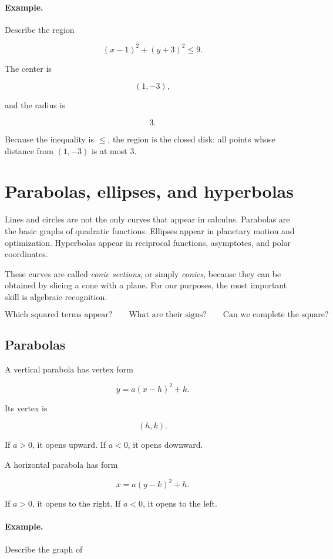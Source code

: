 \paragraph{Example.}
Describe the region

\[
(x-1)^2+(y+3)^2\le 9.
\]

The center is

\[
(1,-3),
\]

and the radius is

\[
3.
\]

Because the inequality is \(\le\), the region is the closed disk: all points whose
distance from \((1,-3)\) is at most \(3\).

\section{Parabolas, ellipses, and hyperbolas}
\label{appsec:conics}

Lines and circles are not the only curves that appear in calculus.  Parabolas are
the basic graphs of quadratic functions.  Ellipses appear in planetary motion and
optimization.  Hyperbolas appear in reciprocal functions, asymptotes, and polar
coordinates.

These curves are called \emph{conic sections}, or simply \emph{conics}, because
they can be obtained by slicing a cone with a plane.  For our purposes, the most
important skill is algebraic recognition.

\[
\text{Which squared terms appear?}
\qquad
\text{What are their signs?}
\qquad
\text{Can we complete the square?}
\]

\subsection{Parabolas}
\label{appsubsec:parabolas}

A vertical parabola has vertex form

\[
\boxed{
y=a(x-h)^2+k.
}
\]

Its vertex is

\[
(h,k).
\]

If \(a>0\), it opens upward.  If \(a<0\), it opens downward.

A horizontal parabola has form

\[
\boxed{
x=a(y-k)^2+h.
}
\]

If \(a>0\), it opens to the right.  If \(a<0\), it opens to the left.

\paragraph{Example.}
Describe the graph of

